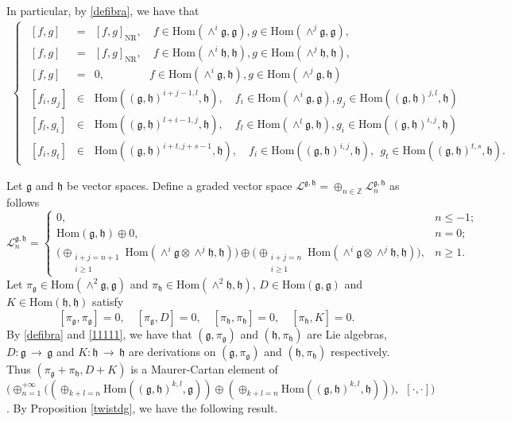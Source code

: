 \documentclass[12pt]{amsart}
\newcommand{\lon }{\,\rightarrow\,}
\newcommand{\g}{\mathfrak g}
\newcommand{\h}{\mathfrak h}
\newcommand{\huaL}{\mathcal{L}}
\newcommand{\Hom}{\mathrm{Hom}}
\newcommand{\NR}{\mathrm{NR}}
\begin{document}
In particular, by \eqref{defibra}, we have that
\begin{eqnarray}\label{11111}
\left\{\begin{array}{rcl}
~~[f, g] &=&[f, g]_{\NR},\quad f\in\Hom(\wedge^i\g, \g), g\in\Hom(\wedge^{j}\g, \g), \\
~~[f, g]&=&[f, g]_{\NR}, \quad f\in\Hom(\wedge^i\h, \h), g\in\Hom(\wedge^j\h, \h),  \\
~~[f, g]&=&0, \quad\quad\quad\quad f\in\Hom(\wedge^{i}\g, \h), g\in\Hom(\wedge^{j}\g, \h)\\
~~[f_i, g_j]&\in&\Hom((\g, \h)^{i+j-1, l}, \h), \quad f_i\in\Hom(\wedge^{i}\g, \g), g_j\in\Hom((\g, \h)^{j, l}, \h)\\
~~[f_l, g_i]&\in&\Hom((\g, \h)^{l+i-1, j}, \h), \quad f_l\in\Hom(\wedge^{l}\g, \h), g_i\in\Hom((\g, \h)^{i, j}, \h)\\
~~[f_i, g_t]&\in&\Hom((\g, \h)^{i+t, j+s-1}, \h), \quad f_i\in\Hom((\g, \h)^{i, j}, \h), ~~g_t\in\Hom((\g, \h)^{t, s}, \h).
\end{array}\right.
\end{eqnarray}

Let $\g$ and $\h$ be vector spaces. Define a graded vector space $\huaL^{\g, \h}=\oplus_{n\in\mathbb{Z}}\huaL^{\g, \h}_n$ as follows
\begin{equation*}
\huaL^{\g, \h}_n=
\begin{cases}
0, & n\leq-1;\\
\Hom(\g, \h)\oplus 0, & n=0;\\
\Big(\oplus_{\substack{i+j=n+1 \\ i\geq 1}}\Hom(\wedge^{i}\g\otimes\wedge^{j}\h, \h)\Big)\oplus\Big(\oplus_{\substack{i+j=n \\ i\geq 1}}\Hom(\wedge^{i}\g\otimes\wedge^{j}\h, \h)\Big), & n\geq 1.
\end{cases}
\end{equation*}
Let $\pi_\g\in\Hom(\wedge^{2}\g, \g)$ and $\pi_\h\in\Hom(\wedge^{2}\h, \h)$, $D\in\Hom(\g, \g)$ and $K\in\Hom(\h, \h)$ satisfy
$$
[\pi_\g, \pi_\g]=0,\quad [\pi_\g, D]=0, \quad [\pi_\h, \pi_\h]=0, \quad [\pi_\h, K]=0.
$$
By \eqref{defibra} and \eqref{11111}, we have that $(\g, \pi_\g)$ and $(\h, \pi_\h)$ are Lie algebras,  $D:\g\lon\g$ and $K:\h\lon\h$ are derivations on $(\g, \pi_\g)$ and $(\h, \pi_\h)$ respectively. Thus $(\pi_\g+\pi_\h, D+K)$ is a Maurer-Cartan element of $\Big(\oplus^{+\infty}_{n=1}\Big((\oplus_{k+l=n}\Hom((\g, \h)^{k,l},\g))\oplus(\oplus_{k+l=n}\Hom((\g, \h)^{k,l},\h))\Big), ~~[\cdot, \cdot]\Big)$. By Proposition \ref{twistdg}, we have the following result.
\end{document}
